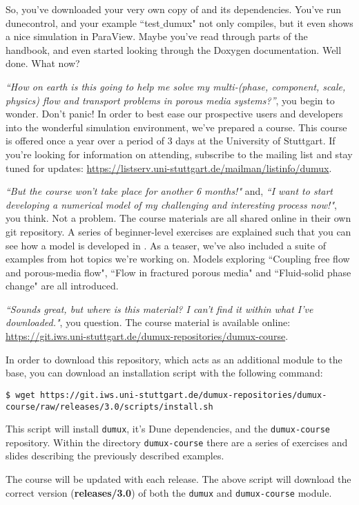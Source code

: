 So, you've downloaded your very own copy of \Dumux and its dependencies.
You've run dunecontrol, and your example ``test$\_$dumux" not only compiles,
but it even shows a nice simulation in ParaView.
Maybe you've read through parts of the handbook, and even started looking
through the Doxygen documentation. 
Well done. What now? \par
%
\textit{``How on earth is this going to help me solve my multi-(phase, component,
scale, physics) flow and transport problems in porous media systems?''}, you begin to wonder.
Don't panic! In order to best ease our prospective users and developers into the
wonderful \Dumux simulation environment, we've prepared a \Dumux course.
This course is offered once a year over a period of 3 days at the University of Stuttgart.
If you're looking for information on attending, subscribe to the \Dumux mailing list
and stay tuned for updates:
\url{https://listserv.uni-stuttgart.de/mailman/listinfo/dumux}. \par
%
\textit{``But the course won't take place for another 6 months!"} and,
\textit{``I want to start developing a numerical model of my challenging and
  interesting process now!"}, you think.
Not a problem. The course materials are all shared online in their own
git repository. A series of beginner-level exercises are explained
such that you can see how a model is developed in \Dumux. As a teaser, we've
 also included a suite of examples from hot topics we're working on. Models
  exploring ``Coupling free flow and porous-media flow", ``Flow in fractured
   porous media" and ``Fluid-solid phase change" are all introduced.  \par
\textit{``Sounds great, but where is this material? I can't find it within
what I've downloaded."}, you question.
The \Dumux course material is available online:
\url{https://git.iws.uni-stuttgart.de/dumux-repositories/dumux-course}. \par
In order to download this repository, which acts as an additional module to
the \Dumux base, you can download an installation script with the following command:
\begin{lstlisting}[style=Bash]
$ wget https://git.iws.uni-stuttgart.de/dumux-repositories/dumux-course/raw/releases/3.0/scripts/install.sh
\end{lstlisting}
This script will install \texttt{dumux}, it's Dune dependencies, and the \texttt{dumux-course}
repository. Within the directory \texttt{dumux-course} there are a series of exercises
and slides describing the previously described examples. \par
%
The \Dumux course will be updated with each \Dumux release.
The above script will download the correct version (\textbf{releases/3.0}) of both
the \texttt{dumux} and \texttt{dumux-course} module.
